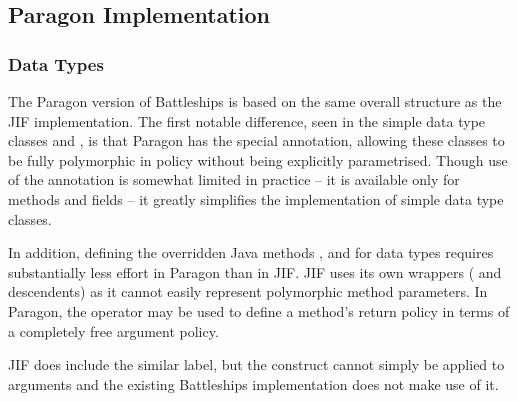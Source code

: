 %

\newpage

\subsection{Paragon Implementation}

\subsubsection{Data Types}

The Paragon version of Battleships is based on the same overall structure as the JIF implementation. The first notable difference, seen in the simple data type classes  and , is that Paragon has the special  annotation, allowing these classes to be fully polymorphic in policy without being explicitly parametrised. Though use of the  annotation is somewhat limited in practice -- it is available only for methods and  fields -- it greatly simplifies the implementation of simple data type classes.

In addition, defining the overridden Java methods ,  and  for data types requires substantially less effort in Paragon than in JIF. JIF uses its own wrappers ( and descendents) as it cannot easily represent polymorphic method parameters. In Paragon, the  operator may be used to define a method's return policy in terms of a completely free argument policy.

JIF does include the similar  label, but the construct cannot simply be applied to arguments and the existing Battleships implementation does not make use of it.

